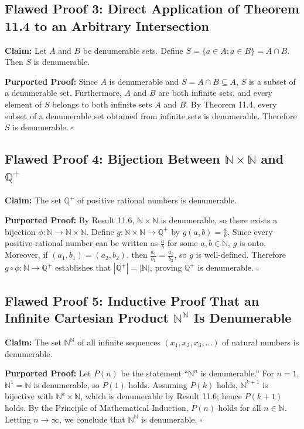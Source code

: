 \documentclass[11pt, letterpaper]{article}
\theoremstyle{definition}
\theoremstyle{remark}
\begin{document}
\subsection{Flawed Proof 3: Direct Application of Theorem 11.4 to an Arbitrary Intersection}

\textbf{Claim:} Let $A$ and $B$ be denumerable sets. Define $S = \{a \in A : a \in B\} = A \cap B$. Then $S$ is denumerable.

\textbf{Purported Proof:} Since $A$ is denumerable and $S = A \cap B \subseteq A$, $S$ is a subset of a denumerable set. Furthermore, $A$ and $B$ are both infinite sets, and every element of $S$ belongs to both infinite sets $A$ and $B$. By Theorem 11.4, every subset of a denumerable set obtained from infinite sets is denumerable. Therefore $S$ is denumerable. $\square$

\subsection{Flawed Proof 4: Bijection Between $\mathbb{N} \times \mathbb{N}$ and $\mathbb{Q}^+$}

\textbf{Claim:} The set $\mathbb{Q}^+$ of positive rational numbers is denumerable.

\textbf{Purported Proof:} By Result 11.6, $\mathbb{N} \times \mathbb{N}$ is denumerable, so there exists a bijection $\phi : \mathbb{N} \to \mathbb{N} \times \mathbb{N}$. Define $g : \mathbb{N} \times \mathbb{N} \to \mathbb{Q}^+$ by $g(a, b) = \frac{a}{b}$. Since every positive rational number can be written as $\frac{a}{b}$ for some $a, b \in \mathbb{N}$, $g$ is onto. Moreover, if $(a_1, b_1) = (a_2, b_2)$, then $\frac{a_1}{b_1} = \frac{a_2}{b_2}$, so $g$ is well-defined. Therefore $g \circ \phi : \mathbb{N} \to \mathbb{Q}^+$ establishes that $|\mathbb{Q}^+| = |\mathbb{N}|$, proving $\mathbb{Q}^+$ is denumerable. $\square$

\subsection{Flawed Proof 5: Inductive Proof That an Infinite Cartesian Product $\mathbb{N}^{\mathbb{N}}$ Is Denumerable}

\textbf{Claim:} The set $\mathbb{N}^{\mathbb{N}}$ of all infinite sequences $(x_1, x_2, x_3, \dots)$ of natural numbers is denumerable.

\textbf{Purported Proof:} Let $P(n)$ be the statement ``$\mathbb{N}^n$ is denumerable.'' For $n = 1$, $\mathbb{N}^1 = \mathbb{N}$ is denumerable, so $P(1)$ holds. Assuming $P(k)$ holds, $\mathbb{N}^{k+1}$ is bijective with $\mathbb{N}^k \times \mathbb{N}$, which is denumerable by Result 11.6; hence $P(k+1)$ holds. By the Principle of Mathematical Induction, $P(n)$ holds for all $n \in \mathbb{N}$. Letting $n \to \infty$, we conclude that $\mathbb{N}^{\mathbb{N}}$ is denumerable. $\square$
\end{document}
